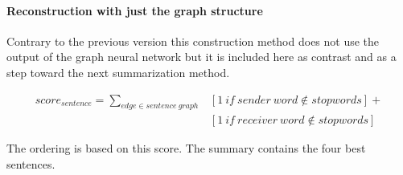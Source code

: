 \paragraph{Reconstruction with just the graph structure}

Contrary to the previous version this construction method does not use the output of the graph neural network but it is included here as contrast and as a step toward the next summarization method.

\begin{eqnarray*}
	score_{sentence} = \sum_{edge \in sentence\ graph} &[1\ if\ sender\ word \notin stopwords] + \\&[1\ if\ receiver\ word \notin stopwords]
\end{eqnarray*}

The ordering is based on this score. The summary contains the four best sentences.

